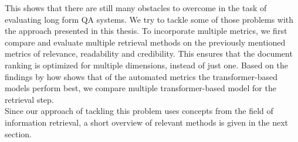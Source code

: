 This shows that there are still many obstacles to overcome in the task of evaluating long form QA systems.
We try to tackle some of those problems with the approach presented in this thesis.
To incorporate multiple metrics, we first compare and evaluate multiple retrieval methods on the previously mentioned metrics of relevance, readability and credibility.
This ensures that the document ranking is optimized for multiple dimensions, instead of just one.
Based on the findings by \cite{xu:2023:A} how shows that of the automated metrics the transformer-based models perform best, we compare multiple transformer-based model for the retrieval step.
\\
Since our approach of tackling this problem uses concepts from the field of information retrieval, a short overview of relevant methods is given in the next section.
\\

